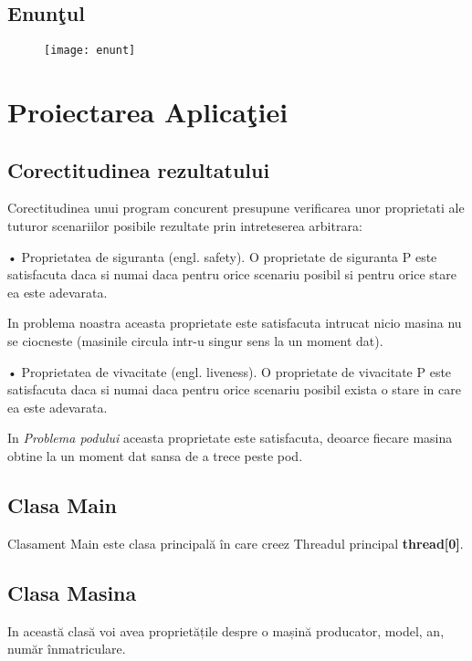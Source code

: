 \documentclass{article}
\begin{document}
\subsection {Enun\c{t}ul}
\hspace{1em}
\justifying
\begin{figure}[h]
    \centering
    \texttt{[image: enunt]}
    \label{fig:img1}
\end{figure}
\pagebreak

\section{Proiectarea Aplica\c{t}iei}

\subsection {Corectitudinea rezultatului}
Corectitudinea unui program concurent presupune verificarea unor proprietati ale tuturor scenariilor posibile rezultate prin intreteserea arbitrara: 

•  Proprietatea de siguranta (engl. safety). O proprietate de siguranta P este satisfacuta daca si numai daca pentru orice scenariu posibil si pentru orice stare ea este adevarata.

In problema noastra aceasta proprietate este satisfacuta intrucat nicio masina nu se ciocneste (masinile circula intr-u singur sens la un moment dat).

•  Proprietatea de vivacitate (engl. liveness). O proprietate de vivacitate P este satisfacuta daca si numai daca pentru orice scenariu posibil exista o stare in care ea este adevarata.

In \textit{Problema podului} aceasta proprietate este satisfacuta, deoarce fiecare masina obtine la un moment dat sansa de a trece peste pod.

\subsection {Clasa Main}
\hspace{1em}
\justifying
Clasament Main este clasa principală în care creez Threadul principal \textbf{thread[0]}.

\subsection {Clasa Masina}
\hspace{1em}
\justifying
In această clasă voi avea proprietățile despre o mașină producator, model, an, număr înmatriculare.
\end{document}
